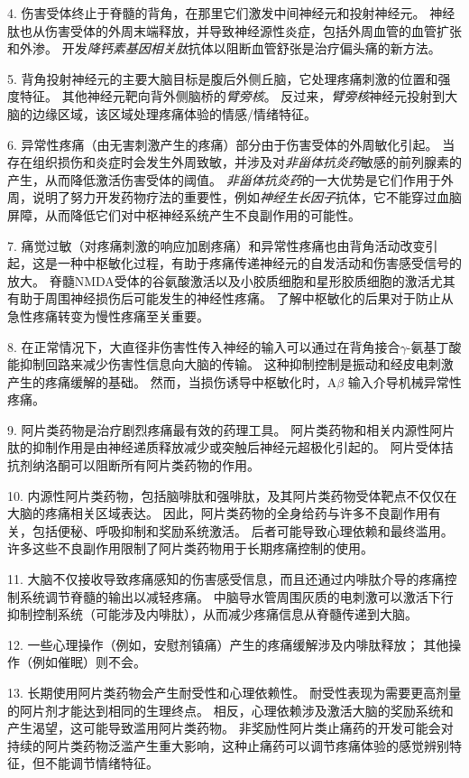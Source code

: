 4. 伤害受体终止于脊髓的背角，在那里它们激发中间神经元和投射神经元。
神经肽也从伤害受体的外周末端释放，并导致神经源性炎症，包括外周血管的血管扩张和外渗。
开发\textit{降钙素基因相关肽}抗体以阻断血管舒张是治疗偏头痛的新方法。 


5. 背角投射神经元的主要大脑目标是腹后外侧丘脑，它处理疼痛刺激的位置和强度特征。
其他神经元靶向背外侧脑桥的\textit{臂旁核}。
反过来，\textit{臂旁核}神经元投射到大脑的边缘区域，该区域处理疼痛体验的情感/情绪特征。
 

6. 异常性疼痛（由无害刺激产生的疼痛）部分由于伤害受体的外周敏化引起。
当存在组织损伤和炎症时会发生外周致敏，并涉及对\textit{非甾体抗炎药}敏感的前列腺素的产生，从而降低激活伤害受体的阈值。
\textit{非甾体抗炎药}的一大优势是它们作用于外周，说明了努力开发药物疗法的重要性，例如\textit{神经生长因子}抗体，它不能穿过血脑屏障，从而降低它们对中枢神经系统产生不良副作用的可能性。


7. 痛觉过敏（对疼痛刺激的响应加剧疼痛）和异常性疼痛也由背角活动改变引起，这是一种中枢敏化过程，有助于疼痛传递神经元的自发活动和伤害感受信号的放大。
脊髓NMDA受体的谷氨酸激活以及小胶质细胞和星形胶质细胞的激活尤其有助于周围神经损伤后可能发生的神经性疼痛。
了解中枢敏化的后果对于防止从急性疼痛转变为慢性疼痛至关重要。 


8. 在正常情况下，大直径非伤害性传入神经的输入可以通过在背角接合$\gamma$-氨基丁酸能抑制回路来减少伤害性信息向大脑的传输。
这种抑制控制是振动和经皮电刺激产生的疼痛缓解的基础。
然而，当损伤诱导中枢敏化时，A$\beta$ 输入介导机械异常性疼痛。
 

9. 阿片类药物是治疗剧烈疼痛最有效的药理工具。
阿片类药物和相关内源性阿片肽的抑制作用是由神经递质释放减少或突触后神经元超极化引起的。
阿片受体拮抗剂纳洛酮可以阻断所有阿片类药物的作用。


10. 内源性阿片类药物，包括脑啡肽和强啡肽，及其阿片类药物受体靶点不仅仅在大脑的疼痛相关区域表达。
因此，阿片类药物的全身给药与许多不良副作用有关，包括便秘、呼吸抑制和奖励系统激活。
后者可能导致心理依赖和最终滥用。
许多这些不良副作用限制了阿片类药物用于长期疼痛控制的使用。


11. 大脑不仅接收导致疼痛感知的伤害感受信息，而且还通过内啡肽介导的疼痛控制系统调节脊髓的输出以减轻疼痛。
中脑导水管周围灰质的电刺激可以激活下行抑制控制系统（可能涉及内啡肽），从而减少疼痛信息从脊髓传递到大脑。


12. 一些心理操作（例如，安慰剂镇痛）产生的疼痛缓解涉及内啡肽释放；
其他操作（例如催眠）则不会。


13. 长期使用阿片类药物会产生耐受性和心理依赖性。
耐受性表现为需要更高剂量的阿片剂才能达到相同的生理终点。
相反，心理依赖涉及激活大脑的奖励系统和产生渴望，这可能导致滥用阿片类药物。
非奖励性阿片类止痛药的开发可能会对持续的阿片类药物泛滥产生重大影响，这种止痛药可以调节疼痛体验的感觉辨别特征，但不能调节情绪特征。


